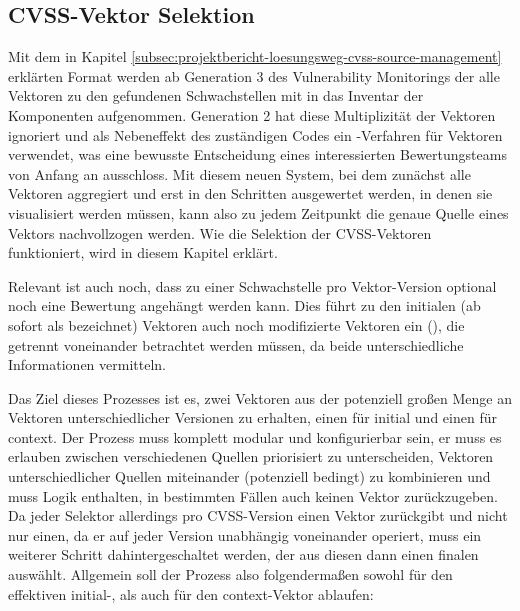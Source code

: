 \subsection{CVSS-Vektor Selektion} \label{subsec:projektbericht-loesungsweg-cvss-selection}

Mit dem in Kapitel \ref{subsec:projektbericht-loesungsweg-cvss-source-management} erklärten Format werden ab Generation 3 des Vulnerability Monitorings der {\metaeffekt} alle Vektoren zu den gefundenen Schwachstellen mit in das Inventar der Komponenten aufgenommen.
Generation 2 hat diese Multiplizität der Vektoren ignoriert und als Nebeneffekt des zuständigen Codes ein -Verfahren für Vektoren verwendet, was eine bewusste Entscheidung eines interessierten Bewertungsteams von Anfang an ausschloss.
Mit diesem neuen System, bei dem zunächst alle Vektoren aggregiert und erst in den Schritten ausgewertet werden, in denen sie visualisiert werden müssen, kann also zu jedem Zeitpunkt die genaue Quelle eines Vektors nachvollzogen werden.
Wie die Selektion der CVSS-Vektoren funktioniert, wird in diesem Kapitel erklärt.

Relevant ist auch noch, dass zu einer Schwachstelle pro Vektor-Version optional noch eine Bewertung angehängt werden kann.
Dies führt zu den initialen (ab sofort als  bezeichnet) Vektoren auch noch modifizierte Vektoren ein (), die getrennt voneinander betrachtet werden müssen, da beide unterschiedliche Informationen vermitteln.

Das Ziel dieses Prozesses ist es, zwei Vektoren aus der potenziell großen Menge an Vektoren unterschiedlicher Versionen zu erhalten, einen für initial und einen für context.
Der Prozess muss komplett modular und konfigurierbar sein, er muss es erlauben zwischen verschiedenen Quellen priorisiert zu unterscheiden, Vektoren unterschiedlicher Quellen miteinander (potenziell bedingt) zu kombinieren und muss Logik enthalten, in bestimmten Fällen auch keinen Vektor zurückzugeben.
Da jeder Selektor allerdings pro CVSS-Version einen Vektor zurückgibt und nicht nur einen, da er auf jeder Version unabhängig voneinander operiert, muss ein weiterer Schritt dahintergeschaltet werden, der aus diesen dann einen finalen auswählt.
Allgemein soll der Prozess also folgendermaßen sowohl für den effektiven initial-, als auch für den context-Vektor ablaufen:

